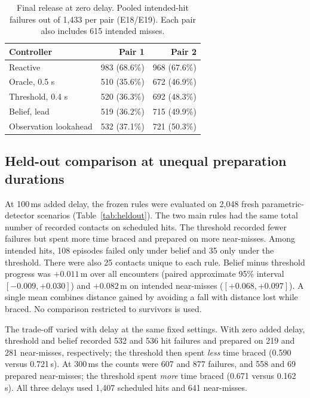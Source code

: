 \documentclass[10pt,twocolumn]{article}
\begin{document}
\begin{table}[t]\centering\small
\caption{Final release at zero delay. Pooled intended-hit failures out of 1,433 per pair (E18/E19). Each pair also includes 615 intended misses.}\label{tab:pairs}
\begin{tabular}{lrr}\toprule
Controller & Pair 1 & Pair 2 \\\midrule
Reactive & 983 (68.6\%) & 968 (67.6\%) \\
Oracle, 0.5 s & 510 (35.6\%) & 672 (46.9\%) \\
Threshold, 0.4 s & 520 (36.3\%) & 692 (48.3\%) \\
Belief, lead & 519 (36.2\%) & 715 (49.9\%) \\
Observation lookahead & 532 (37.1\%) & 721 (50.3\%) \\\bottomrule

\end{tabular}
\end{table}


\subsection{Held-out comparison at unequal preparation durations}
At 100\,ms added delay, the frozen rules were evaluated on 2,048 fresh parametric-detector scenarios (Table~\ref{tab:heldout}). The two main rules had the same total number of recorded contacts on scheduled hits. The threshold recorded fewer failures but spent more time braced and prepared on more near-misses. Among intended hits, 108 episodes failed only under belief and 35 only under the threshold. There were also 25 contacts unique to each rule. Belief minus threshold progress was $+0.011$\,m over all encounters (paired approximate 95\% interval $[-0.009,+0.030]$) and $+0.082$\,m on intended near-misses ($[+0.068,+0.097]$). A single mean combines distance gained by avoiding a fall with distance lost while braced. No comparison restricted to survivors is used.


The trade-off varied with delay at the same fixed settings. With zero added delay, threshold and belief recorded 532 and 536 hit failures and prepared on 219 and 281 near-misses, respectively; the threshold then spent \emph{less} time braced (0.590 versus 0.721\,s). At 300\,ms the counts were 607 and 877 failures, and 558 and 69 prepared near-misses; the threshold spent \emph{more} time braced (0.671 versus 0.162\,s). All three delays used 1,407 scheduled hits and 641 near-misses.
\end{document}
